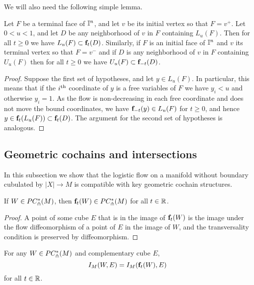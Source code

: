 We will also need the following simple lemma.

\begin{lemma}\label{L:domain flow}
	Let $F$ be a terminal face of $\mathbb{I}^n$, and let $v$ be its initial vertex so that $F=v^+$.
	Let $0<u<1$, and let $D$ be any neighborhood of $v$ in $F$ containing $L_u(F)$.
	Then for all $t\geq 0$ we have $L_u(F)\subset \mathbf{f}_t(D)$.
	Similarly, if $F$ is an initial face of $\mathbb{I}^n$ and $v$ its terminal vertex so that $F=v^-$ and if $D$ is any neighborhood of $v$ in $F$ containing $U_u(F)$ then for all $t\geq 0$ we have $U_u(F)\subset \mathbf{f}_{-t}(D)$.
\end{lemma}

\begin{proof}
	Suppose the first set of hypotheses, and let $y \in L_u(F)$.
	In particular, this means that if the $i^{\mathrm{th}}$ coordinate of $y$ is a free variables of $F$ we have $y_i < u$ and otherwise $y_i = 1$.
	As the flow is non-decreasing in each free coordinate and does not move the bound coordinates, we have $\mathbf{f}_{-t}(y)\in L_u(F)$ for $t\geq 0$, and hence $y \in \mathbf{f}_t(L_u(F)) \subset \mathbf{f}_t(D)$.
	The argument for the second set of hypotheses is analogous.
\end{proof}

\subsection{Geometric cochains and intersections}

In this subsection we show that the logistic flow on a manifold without boundary cubulated by $|X| \to M$ is compatible with key geometric cochain structures.

\begin{lemma}\label{L:flow preserves transversality}
	If $W \in PC_{\pitchfork}^*(M)$, then $\mathbf{f}_t(W)\in PC_{\pitchfork}^*(M)$ for all $t \in \mathbb{R}$.
\end{lemma}

\begin{proof}
	A point of some cube $E$ that is in the image of $\mathbf{f}_t(W)$ is the image under the flow diffeomorphism of a point of $E$ in the image of $W$, and the transversality condition is preserved by diffeomorphism.
\end{proof}

\begin{lemma}
	For any $W \in PC_{\pitchfork}^*(M)$ and complementary cube $E$,
	\begin{equation*}
		I_M(W, E) = I_M(\mathbf{f}_t(W), E)
	\end{equation*}
	for all $t \in \mathbb{R}$.
\end{lemma}

